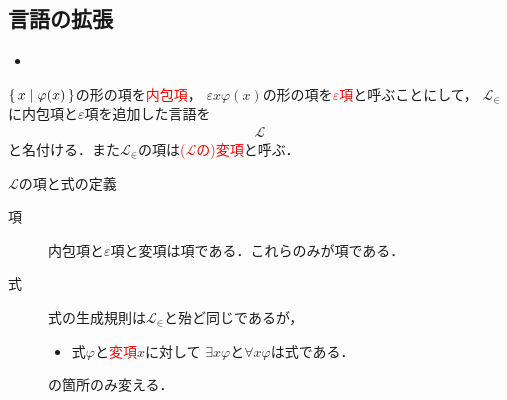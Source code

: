\newpage
\subsection{言語の拡張}
	\begin{itemize}
		\item 
	\end{itemize}
	$\left\{\, x \mid \varphi(x)\, \right\}$の形の項を\textcolor{red}{内包項}，
	$\varepsilon x \varphi(x)$の形の項を\textcolor{red}{$\varepsilon$項}と呼ぶことにして，
	$\mathcal{L}_{\in}$に内包項と$\varepsilon$項を追加した言語を
	\begin{align}
		\mathcal{L}
	\end{align}
	と名付ける．また$\mathcal{L}_{\in}$の項は\textcolor{red}{($\mathcal{L}$の)変項}と呼ぶ．
	
	
	\begin{itembox}[l]{$\mathcal{L}$の項と式の定義}
		\begin{description}
			\item[項] 内包項と$\varepsilon$項と変項は項である．これらのみが項である．
			\item[式] 式の生成規則は$\mathcal{L}_{\in}$と殆ど同じであるが，
				\begin{itemize}
					\item 式$\varphi$と\textcolor{red}{変項}$x$に対して
						$\exists x \varphi$と$\forall x \varphi$は式である．
				\end{itemize}
				の箇所のみ変える．
		\end{description}
	\end{itembox}